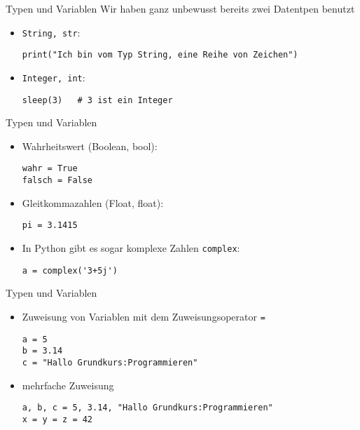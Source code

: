 \begin{frame}[fragile]{Typen und Variablen}
Wir haben ganz unbewusst bereits zwei Datentpen benutzt
\begin{itemize}
    \item \texttt{String, str}: 
    \begin{lstlisting}
print("Ich bin vom Typ String, eine Reihe von Zeichen")
    \end{lstlisting}
    \item \texttt{Integer, int}: 
    \begin{lstlisting}
sleep(3)   # 3 ist ein Integer
    \end{lstlisting}
\end{itemize}
\end{frame}

\begin{frame}[fragile]{Typen und Variablen}
\begin{itemize}
    \item Wahrheitswert (Boolean, bool): 
    \begin{lstlisting}
wahr = True
falsch = False
    \end{lstlisting}
    \item Gleitkommazahlen (Float, float):
    \begin{lstlisting}
pi = 3.1415
    \end{lstlisting}
    \item In Python gibt es sogar komplexe Zahlen \texttt{complex}:
    \begin{lstlisting}
a = complex('3+5j')
    \end{lstlisting}

\end{itemize}
\end{frame}

\begin{frame}[fragile]{Typen und Variablen}
\begin{itemize}
    \item Zuweisung von Variablen mit dem Zuweisungsoperator \texttt{=}
    \begin{lstlisting}
a = 5
b = 3.14
c = "Hallo Grundkurs:Programmieren"
    \end{lstlisting}
    \item mehrfache Zuweisung 
    \begin{lstlisting}
a, b, c = 5, 3.14, "Hallo Grundkurs:Programmieren"
x = y = z = 42
    \end{lstlisting}
\end{itemize}
\end{frame}


